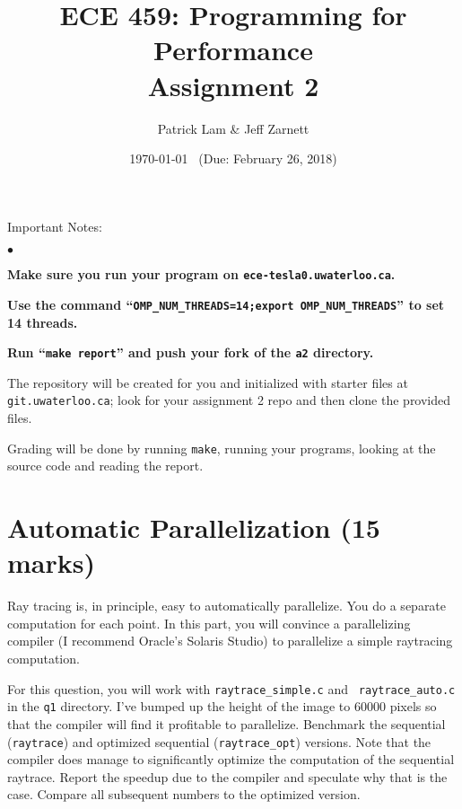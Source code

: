 \documentclass[letterpaper,10pt]{article}
\title{\bf ECE 459: Programming for Performance\\Assignment 2}
\author{Patrick Lam \& Jeff Zarnett}
\date{\today ~ (Due: February 26, 2018)}
\begin{document}
\maketitle
\newcommand{\squishlist}{
 \begin{list}{$\bullet$}
  { \setlength{\itemsep}{0pt}
     \setlength{\parsep}{3pt}
     \setlength{\topsep}{3pt}
     \setlength{\partopsep}{0pt}
     \setlength{\leftmargin}{1.5em}
     \setlength{\labelwidth}{1em}
     \setlength{\labelsep}{0.5em} } }
\newcommand{\squishend}{
  \end{list}  }

\noindent
Important Notes:

\squishlist
  \item {\bf Make sure you run your program on {\tt ece-tesla0.uwaterloo.ca}.}
  \item {\bf Use the command ``{\tt OMP\_NUM\_THREADS=14;export OMP\_NUM\_THREADS}'' to set 14 threads.}
  \item {\bf Run ``{\tt make report}'' and push your fork of the {\tt a2} directory.}
\squishend

\noindent
The repository will be created for you and initialized with starter files 
at \texttt{git.uwaterloo.ca}; look for your 
assignment 2 repo and then clone the provided files.

Grading will be done by running {\tt make}, running your programs,
looking at the source code and reading the report.

\section{Automatic Parallelization (15 marks)}
Ray tracing is, in principle, easy to automatically parallelize. You do
a separate computation for each point. In this part, you will convince a
parallelizing compiler (I recommend Oracle's Solaris Studio) to parallelize
a simple raytracing computation.

For this question, you will work with {\tt raytrace\_simple.c} and {\tt
  raytrace\_auto.c} in the {\tt q1} directory.  I've bumped up the
height of the image to 60000 pixels so that the compiler will find it
profitable to parallelize. Benchmark the sequential ({\tt raytrace})
and optimized sequential ({\tt raytrace\_opt}) versions. Note that the
compiler does manage to significantly optimize the computation of the sequential
raytrace. Report the speedup due to the compiler and
speculate why that is the case. Compare all subsequent numbers
to the optimized version.
\end{document}

